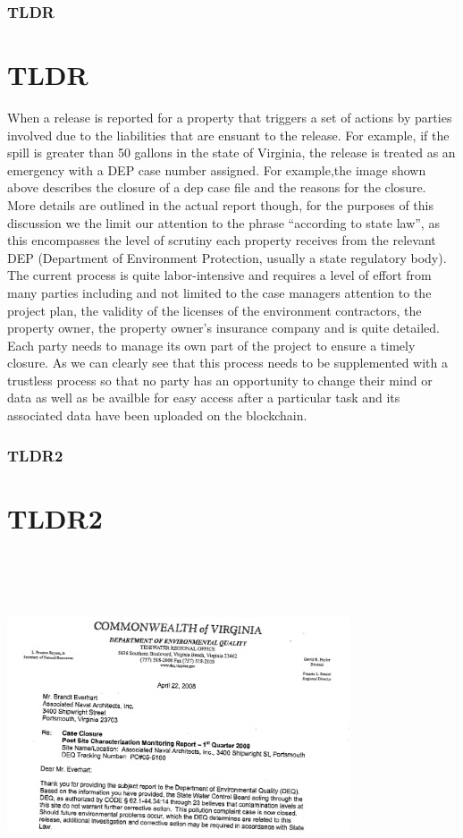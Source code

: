 \documentclass{beamer}
\newcommand{\quotes}[1]{``#1''}
\begin{document}
\begin{frame}
\frametitle{TLDR}
\section{TLDR}
  When a release is reported for a property that triggers a set of actions by parties involved due to the liabilities that are ensuant to the release. For example, if the spill is greater than 50 gallons in the state of Virginia, the release is treated as an emergency with a DEP case number assigned. For example,the image shown above describes the closure of a dep case file and the reasons for the closure. More details are outlined in the actual report though, for the purposes of this discussion we the limit our attention to the phrase \quotes{according to state law}, as this encompasses the level of scrutiny each property receives from the relevant DEP (Department of Environment Protection, usually a state regulatory body). The current process is quite labor-intensive and requires a level of effort from many parties including and not limited to the case managers attention to the project plan, the validity of the licenses of the environment contractors, the property owner, the property owner's insurance company and is quite detailed. Each party needs to manage its own part of the project to ensure a timely closure. As we can clearly see that this process needs to be supplemented with a trustless process so that no party has an opportunity to change their mind or data as well as be availble for easy access after a particular task and its associated data have been uploaded on the blockchain.
  
\end{frame}

\begin{frame}
\frametitle{TLDR2}
\section {TLDR2}
  \includegraphics[width = 4in, height = 4in]{vadeqnfa}
\end{frame}
\end{document}
